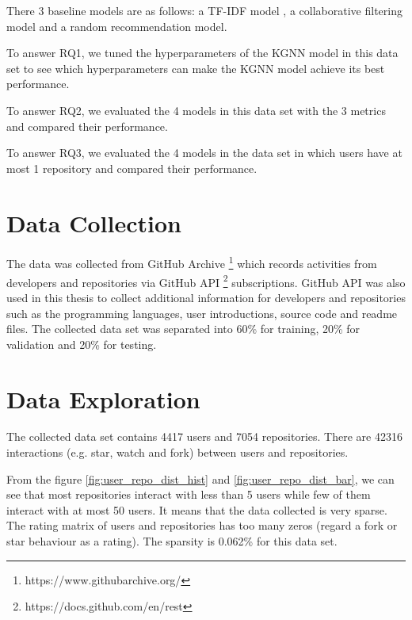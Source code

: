 \documentclass[11pt,twoside]{report}
\begin{document}
There 3 baseline models are as follows: a TF-IDF model \cite{xu_repersp_2017,inka_open_2018,sun_personalized_2018,zhang_detecting_2017}, a collaborative filtering model \cite{guendouz_recommending_2015} and a random recommendation model.

To answer RQ1, we tuned the hyperparameters of the KGNN model in this data set to see which hyperparameters can make the KGNN model achieve its best performance.

To answer RQ2, we evaluated the 4 models in this data set with the 3 metrics and compared their performance.

To answer RQ3, we evaluated the 4 models in the data set in which users have at most 1 repository and compared their performance.

\section{Data Collection}
The data was collected from GitHub Archive \footnote{https://www.githubarchive.org/} which records activities from developers and repositories via GitHub API \footnote{https://docs.github.com/en/rest} subscriptions. GitHub API was also used in this thesis to collect additional information for developers and repositories such as the programming languages, user introductions, source code and readme files. The collected data set was separated into 60\% for training, 20\% for validation and 20\% for testing.

\section{Data Exploration}
The collected data set contains 4417 users and 7054 repositories. There are 42316 interactions (e.g. star, watch and fork) between users and repositories.

From the figure \ref{fig:user_repo_dist_hist} and \ref{fig:user_repo_dist_bar}, we can see that most repositories interact with less than 5 users while few of them interact with at most 50 users. It means that the data collected is very sparse. The rating matrix of users and repositories has too many zeros (regard a fork or star behaviour as a rating). The sparsity is 0.062\% for this data set.
\end{document}
